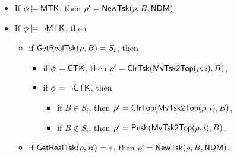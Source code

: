 % 
\noindent \fbox{$\phi \models \ndmflag$}

\begin{itemize}
    \item If $\phi \models {\sf MTK}$, then $\rho'=\mathsf{NewTsk}(\rho, B, {\sf NDM})$.
    \item If $\phi \models \neg {\sf MTK}$, then
   \begin{itemize}
        \item if $\mathsf{GetRealTsk}(\rho, B) = S_i$, then
		\begin{itemize}
			\item if $\phi \models {\sf CTK}$, then $\rho' = \mathsf{ClrTsk}(\mathsf{MvTsk2Top}(\rho, i), B)$,
			\item if $\phi \models \neg {\sf CTK}$, then
			\begin{itemize}
				\item if $B\in S_i$, then $\rho' = \mathsf{ClrTop}(\mathsf{MvTsk2Top}(\rho, i), B)$,
				\item if $B\notin S_i$, then $\rho' = \mathsf{Push}(\mathsf{MvTsk2Top}(\rho, i), B)$,
			\end{itemize}
		\end{itemize}
        \item if $\mathsf{GetRealTsk}(\rho, B) = *$, then $\rho' = \mathsf{NewTsk}(\rho, B, {\sf NDM})$.
	\end{itemize}
\end{itemize}

% 
\smallskip
\noindent \fbox{$\phi \models \ntkflag \wedge \neg \ndmflag$}

